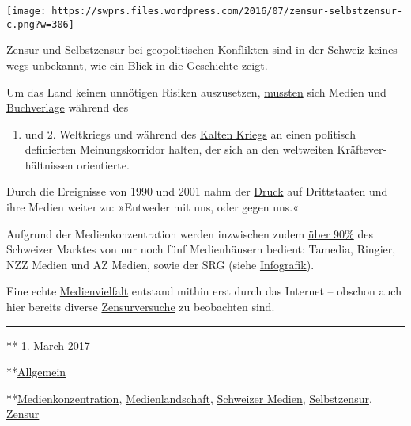 \texttt{[image: https://swprs.files.wordpress.com/2016/07/zensur-selbstzensur-c.png?w=306]}

Zensur und Selbst­zensur bei geo­po­li­tischen Kon­f‌lik­ten sind in der
Schweiz keines­wegs un­be­kannt, wie ein Blick in die Ge­schichte zeigt.

Um das Land keinen un­nöti­gen Ri­si­ken aus­zu­setzen,
\href{http://www.amazon.de/Selbstzensur-schweizerische-Pressepolitik-Zweiten-Weltkrieg/dp/3719304566}{muss­ten}
sich Medien und
\href{https://www.chronos-verlag.ch/node/20528}{Buch­ver­lage} wäh­rend
des

\begin{enumerate}
\def\labelenumi{\arabic{enumi}.}
\tightlist
\item
  und 2. Welt­kriegs und während des
  \href{http://www.swissinfo.ch/ger/das-ende-eines-nationalen-maenner-netzwerks/4205194}{Kal­ten
  Kriegs} an einen po­li­tisch definierten Mei­nungs­korri­dor halten,
  der sich an den welt­wei­ten Kräfte­ver­hält­nissen orientierte.
\end{enumerate}

Durch die Ereignisse von 1990 und 2001 nahm der
\href{https://www.youtube.com/watch?v=a4eGtXFDFJA}{Druck} auf
Drittstaaten und ihre Medien wei­ter zu: »Entweder mit uns, oder gegen
uns.«

Aufgrund der Medien­kon­zen­tration werden in­zwi­schen zudem
\href{https://swprs.files.wordpress.com/2018/03/broschur_jahrbuch_foeg_deutsch_2015.pdf\#page=13}{über
90\%} des Schwei­zer Mark­tes von nur noch fünf Medien­häusern bedient:
Tamedia, Ringier, NZZ Medien und AZ Medien, sowie der SRG (siehe
\href{https://swprs.org/netzwerk-medien-schweiz/}{Info­grafik}).

Eine echte \href{https://swprs.org/medien-navigator/}{Medienvielfalt}
entstand mithin erst durch das Internet -- obschon auch hier bereits
diverse
\href{https://www.heise.de/tp/features/Facebook-Fake-News-und-die-Privatisierung-der-Zensur-3599878.html}{Zensurversuche}
zu beobachten sind.

\begin{center}\rule{0.5\linewidth}{\linethickness}\end{center}

** 1. March 2017

**\href{https://swprs.org/category/allgemein/}{Allgemein}

**\href{https://swprs.org/tag/medienkonzentration/}{Medienkonzentration},
\href{https://swprs.org/tag/medienlandschaft/}{Medienlandschaft},
\href{https://swprs.org/tag/schweizer-medien/}{Schweizer Medien},
\href{https://swprs.org/tag/selbstzensur/}{Selbstzensur},
\href{https://swprs.org/tag/zensur/}{Zensur}

